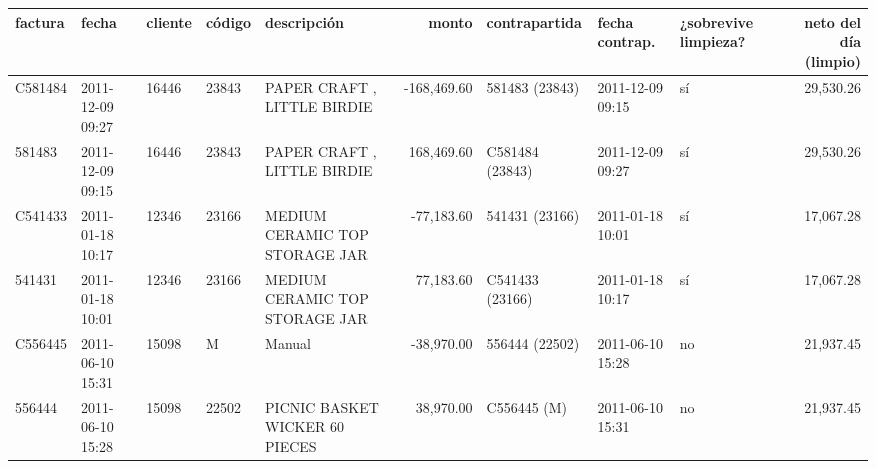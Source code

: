\begin{tabular}{lllllrlllr}
\toprule
factura & fecha & cliente & código & descripción & monto & contrapartida & fecha contrap. & ¿sobrevive limpieza? & neto del día (limpio) \\
\midrule
C581484 & 2011-12-09 09:27 & 16446 & 23843 & PAPER CRAFT , LITTLE BIRDIE & -168,469.60 & 581483 (23843) & 2011-12-09 09:15 & sí & 29,530.26 \\
581483 & 2011-12-09 09:15 & 16446 & 23843 & PAPER CRAFT , LITTLE BIRDIE & 168,469.60 & C581484 (23843) & 2011-12-09 09:27 & sí & 29,530.26 \\
C541433 & 2011-01-18 10:17 & 12346 & 23166 & MEDIUM CERAMIC TOP STORAGE JAR & -77,183.60 & 541431 (23166) & 2011-01-18 10:01 & sí & 17,067.28 \\
541431 & 2011-01-18 10:01 & 12346 & 23166 & MEDIUM CERAMIC TOP STORAGE JAR & 77,183.60 & C541433 (23166) & 2011-01-18 10:17 & sí & 17,067.28 \\
C556445 & 2011-06-10 15:31 & 15098 & M & Manual & -38,970.00 & 556444 (22502) & 2011-06-10 15:28 & no & 21,937.45 \\
556444 & 2011-06-10 15:28 & 15098 & 22502 & PICNIC BASKET WICKER 60 PIECES & 38,970.00 & C556445 (M) & 2011-06-10 15:31 & no & 21,937.45 \\
\bottomrule
\end{tabular}